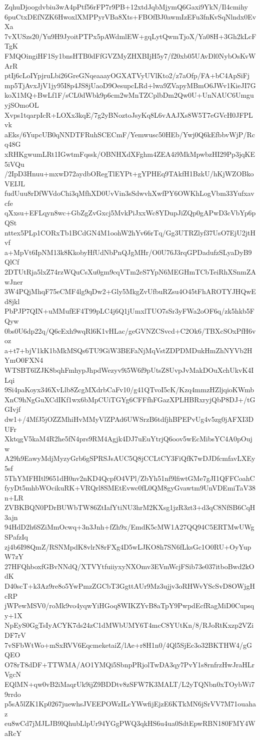 ZqhuDjoogdvbiu3wA4pPtf56rFP7r9PB+12xtdJqbMjymQ6Gaxi9YkN/Il4cmihy
6puCtxDEfNZK6HwoxlXMPPyrVBa8Xts+FBOfBJ0awmIzEFu3fnKvSqNlndx0EvXa
7vXUSzs20/Yu9H9JyoitPTPx5pAWdmlEW+gqLytQwmTjoX/Ya08H+3Gh2kLcFTgK
FMQOingiHF1Sy1bnsHTB0dFfGVZMyZHXBIjH5y7/f20xb05UAvDl0NybOsKvWArR
ptIj6cLoIYpjruLbi26GreGNqeaaayOGXATVyUVlKto2/z7aOfp/FA+bC4ApSiFj
mp5TjAvxJjV1jy95I8p4JS8jUaoD9OesupcLRd+lwa9ZVapyMBmO6JWv1KieJI7G
koX1MQ+BwLf1F/sCL0dWbk9p6cm2wMnTZCplbDm2Qw0U+UnNAUC6UmguyjSOmoOL
Xvps1tqarpIcR+LOXx3kqE/7g2yBNoztoJsyKq8L6vAAJXs8W5T7eGVcH0JFPLvk
aEks/6YupcUB0qNNDTFRuhSCECmF/Yemwusc50HEb/Ywj0Q6kEfbbvWjP/Rcq48G
xRHKgwumLRt1IGwtmFqssk/OBNHXdXFghm4ZEA4i9MkMpwbzHI29Pp3jqKE5iVQu
/2IpD3Hnuu+mxwD72aydbORegTlEYPt+gYPHEq9TAkfH1BzkU/hKjWZOBkoVEIJL
fudUuu8rDfWVdoChi3qMfhXD0UvVin3sSdwvhXwfPY6OWKhLogVbm33Yufxavcfe
qXxsu+EFLqyn8wc+GbZgZvGxcj5MvkPiJxxWc8YDupJiZQp0gAPwD3cVbYp6pQSt
nttex5PLp1CORxTb1BCdGN4M1oohW2hYv66rTq/Gg3UTRZlyf37UsO7EjU2jtHvf
a+MpVt6IpNM13k8KkobyHfUdNbPnQJgMHr/O0U76J3rqGPDadufzSLyaDyB9QlCf
2DTUtRja5lxZ74rzWQuCsXu0gm9cqVTm2eS7YpN6MEGHmTCbTeiRhXSnmZAwJner
3W4PQjMhqF75eCMF4lg9qDw2+Gly5MkgZvUfbuRZsu4O45tFhAROTYJHQwEd8jkl
PbPJP7QIN+uMMufEF4T99pLC4j6Q1jUmxlTUO7sSr3yFWa2oOF6q/zk5hkb5FQyw
0bs0U6dp22q/Q6cExh9wqRl6K1vHLac/geGVNZCSvcd+C2Ok6/TBXcSOxPfH6voz
a+t7+bjV1kK1bMkMSQs6TU9GiW3BEFaNjMqVstZDPDMDukHmZhNYVb2HYmO0FXN4
WTSBT6lZJK8bqhFmhypJhpdWezyv9i5W6f9pUtsZ8UvpJvMakDOuXchUkvK4ILqi
9Si4paKoyx346XvLlb8ZcgMXdrbCaFv10/g41QTvoI5cK/Kzq4mmzHZljqioKWmb
XnC9hNgGuXCdIKf1wx6bMpCUiTGYg6CFFfhFGazXPLHBRxryjQbP8DJ+/tGGIvjf
dw1+/4MfJ5jOZZMhiHvMMyVlZPAd6UWSrzB6tdfjhBPEPvUg4v5zg0jAFXI3DUFr
XktqgV5kaM4R2he5fN4prs9RM4Agjk4DJ7uEuYtrjQ6oov5wEcMibsYC4A0pOujw
A29h9EawyMdjMyzyGrb6gSPRSJsAUC5Q8jCCLtCY3FiQfK7wDJDfcmfavLXEy5sf
5ThYMFHItl9651dH0nv2nKD4QcpfO4VPl/ZbYh51nf9lfiwtGMe7gJI1QFFCoahC
fyyDt5mhbWOcikuRK+VRQrl8SMEtEvwc0fL0QM8gyGvawtm9UnVDEmiTaV38n+LR
ZVBKBQN0PDrBUWbTW86ZtIafYtiNU3hrM2KXsg1jzR3zt3+d3qC8NfSB6CqH3ajn
94HdD2h6SZiMmOcwq+3n3Jnh+fZh9x/EmdK5cMW1A27QQ94C5ERTMwUWgSPafzIq
zj4b6I98QmZ/RSNMpdK8vlrN8rFXg4D5wLJKO8h7SN6fLksGc1O0RU+OyYupW7zY
27HFQhboxfGBvNNdQ/XTVYtfuiiyxyNXOmv3EVmWcjFSib73e037itboBwd2kOdK
D40scT+k3Az9re8o5YwPmzZGCbT3GgttAUr9Mz3ujjv3oRHWvYScSvD8OWjgHcRP
jWPewMSV0/roMk9vo4yqwYiHGoq8WIKZYvB8aTpY9PwpdEcfRagMiD0Cupsqy+1X
NpEyS0GgTsIyACYK7ds24zC1dMWbUMY6T4mcC8YUtKn/8/RJoRtKxzp2VZiDF7rV
7vSFbWtWo+mSxRVV6EqcmeketaiZ/lAe+r8H1n0/4Ql5SjEc3o32BKTHW4/gGQEO
O78rT8dDF+TTWMA/AO1YMQi5SbnpPRjolTwDA3qy7PvY1s8rnfrzHwJraHLrVgcN
EQlMN+qw0vB2iMaqrUk9ijZ9BDDtv8zSFW7K3MALT/L2yTQNbn0xTOybWi79rrdo
p5sA5lZK1Kp0267juewhsJVEEPOWzILcYWwfijEjzE6KTkMN6jSrVV7M71ouahaz
eu8wCd7jMJLJB9lQhubLlpUr94YGgPWQ3qkHS6u4ua0SdtEpwRBN180FMY4WaRcY
